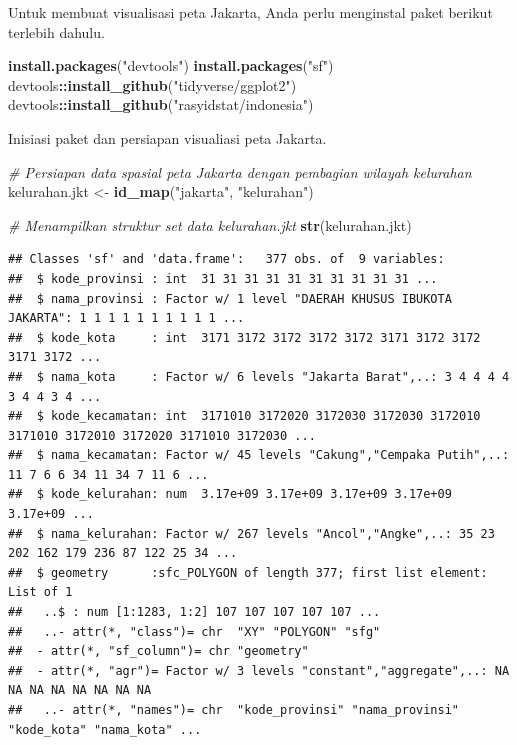 \documentclass[openany]{book}
\newenvironment{Shaded}{\begin{snugshade}}{\end{snugshade}}
\newcommand{\KeywordTok}[1]{\textcolor[rgb]{0.13,0.29,0.53}{\textbf{#1}}}
\newcommand{\StringTok}[1]{\textcolor[rgb]{0.31,0.60,0.02}{#1}}
\newcommand{\CommentTok}[1]{\textcolor[rgb]{0.56,0.35,0.01}{\textit{#1}}}
\newcommand{\OperatorTok}[1]{\textcolor[rgb]{0.81,0.36,0.00}{\textbf{#1}}}
\newcommand{\NormalTok}[1]{#1}
\begin{document}
Untuk membuat visualisasi peta Jakarta, Anda perlu menginstal paket
berikut terlebih dahulu.

\begin{Shaded}
\begin{Highlighting}[]
\KeywordTok{install.packages}\NormalTok{(}\StringTok{"devtools"}\NormalTok{)}
\KeywordTok{install.packages}\NormalTok{(}\StringTok{"sf"}\NormalTok{)}
\NormalTok{devtools}\OperatorTok{::}\KeywordTok{install_github}\NormalTok{(}\StringTok{"tidyverse/ggplot2"}\NormalTok{)}
\NormalTok{devtools}\OperatorTok{::}\KeywordTok{install_github}\NormalTok{(}\StringTok{"rasyidstat/indonesia"}\NormalTok{) }
\end{Highlighting}
\end{Shaded}

Inisiasi paket dan persiapan visualiasi peta Jakarta.

\begin{Shaded}
\begin{Highlighting}[]
\CommentTok{# Persiapan data spasial peta Jakarta dengan pembagian wilayah kelurahan}
\NormalTok{kelurahan.jkt <-}\StringTok{ }\KeywordTok{id_map}\NormalTok{(}\StringTok{"jakarta"}\NormalTok{, }\StringTok{"kelurahan"}\NormalTok{)}

\CommentTok{# Menampilkan struktur set data kelurahan.jkt}
\KeywordTok{str}\NormalTok{(kelurahan.jkt)}
\end{Highlighting}
\end{Shaded}

\begin{verbatim}
## Classes 'sf' and 'data.frame':   377 obs. of  9 variables:
##  $ kode_provinsi : int  31 31 31 31 31 31 31 31 31 31 ...
##  $ nama_provinsi : Factor w/ 1 level "DAERAH KHUSUS IBUKOTA JAKARTA": 1 1 1 1 1 1 1 1 1 1 ...
##  $ kode_kota     : int  3171 3172 3172 3172 3172 3171 3172 3172 3171 3172 ...
##  $ nama_kota     : Factor w/ 6 levels "Jakarta Barat",..: 3 4 4 4 4 3 4 4 3 4 ...
##  $ kode_kecamatan: int  3171010 3172020 3172030 3172030 3172010 3171010 3172010 3172020 3171010 3172030 ...
##  $ nama_kecamatan: Factor w/ 45 levels "Cakung","Cempaka Putih",..: 11 7 6 6 34 11 34 7 11 6 ...
##  $ kode_kelurahan: num  3.17e+09 3.17e+09 3.17e+09 3.17e+09 3.17e+09 ...
##  $ nama_kelurahan: Factor w/ 267 levels "Ancol","Angke",..: 35 23 202 162 179 236 87 122 25 34 ...
##  $ geometry      :sfc_POLYGON of length 377; first list element: List of 1
##   ..$ : num [1:1283, 1:2] 107 107 107 107 107 ...
##   ..- attr(*, "class")= chr  "XY" "POLYGON" "sfg"
##  - attr(*, "sf_column")= chr "geometry"
##  - attr(*, "agr")= Factor w/ 3 levels "constant","aggregate",..: NA NA NA NA NA NA NA NA
##   ..- attr(*, "names")= chr  "kode_provinsi" "nama_provinsi" "kode_kota" "nama_kota" ...
\end{verbatim}
\end{document}
